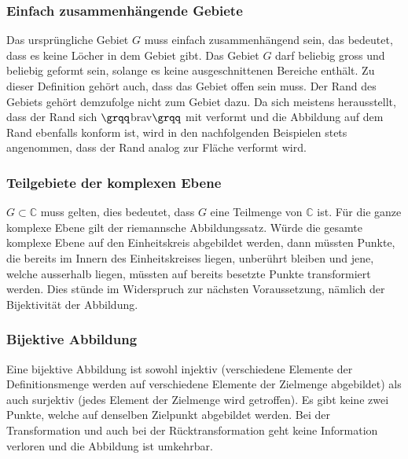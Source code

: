 \subsubsection{Einfach zusammenhängende Gebiete}
Das ursprüngliche Gebiet $G$ muss einfach zusammenhängend sein, das bedeutet, dass es keine Löcher in dem Gebiet gibt. 
Das Gebiet $G$ darf beliebig gross und beliebig geformt sein, solange es keine ausgeschnittenen Bereiche enthält.
Zu dieser Definition gehört auch, dass das Gebiet offen sein muss. 
Der Rand des Gebiets gehört demzufolge nicht zum Gebiet dazu.
Da sich meistens herausstellt, dass der Rand sich $\grqq$brav$\grqq$ mit verformt und die Abbildung auf dem Rand ebenfalls konform ist, wird in den nachfolgenden Beispielen stets angenommen, dass der Rand analog zur Fläche verformt wird.


\subsubsection{Teilgebiete der komplexen Ebene}
$ G \subset \mathbb{C} $ muss gelten, dies bedeutet, dass $G$ eine Teilmenge von $\mathbb{C}$ ist.
Für die ganze komplexe Ebene gilt der riemannsche Abbildungssatz.
Würde die gesamte komplexe Ebene auf den Einheitskreis abgebildet werden, dann müssten Punkte, die bereits im Innern des Einheitskreises liegen, unberührt bleiben und jene, welche ausserhalb liegen, müssten auf bereits besetzte Punkte transformiert werden. 
Dies stünde im Widerspruch zur nächsten Voraussetzung, nämlich der Bijektivität der Abbildung.

\subsubsection{Bijektive Abbildung}
Eine bijektive Abbildung ist sowohl injektiv (verschiedene Elemente der Definitionsmenge werden auf verschiedene Elemente der Zielmenge abgebildet) als auch surjektiv (jedes Element der Zielmenge wird getroffen).
Es gibt keine zwei Punkte, welche auf denselben Zielpunkt abgebildet werden. 
Bei der Transformation und auch bei der Rücktransformation geht keine Information verloren und die Abbildung ist umkehrbar.

